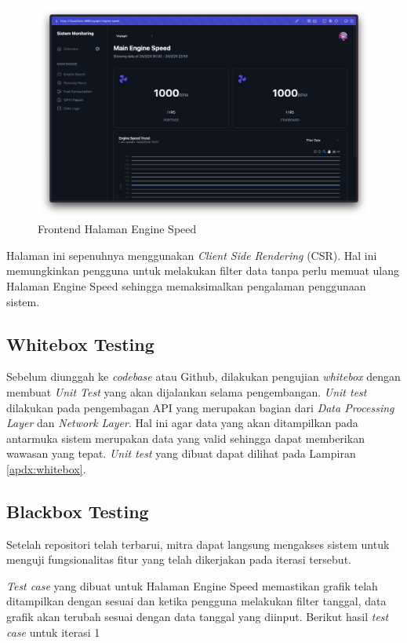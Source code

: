 \begin{figure}[!h]
    \includegraphics[width=1.05\linewidth, center]{images/hasil/iterations/1/fe-es.png}
    \caption{Frontend Halaman Engine Speed}
    \label{fig:fe-es}
\end{figure}

Halaman ini sepenuhnya menggunakan \textit{Client Side Rendering} (CSR). Hal ini memungkinkan pengguna untuk melakukan filter data tanpa perlu memuat ulang Halaman Engine Speed sehingga memaksimalkan pengalaman penggunaan sistem.

\subsection{Whitebox Testing}

Sebelum diunggah ke \textit{codebase} atau Github, dilakukan pengujian \textit{whitebox} dengan membuat \textit{Unit Test} yang akan dijalankan selama pengembangan. \textit{Unit test} dilakukan pada pengembagan API yang merupakan bagian dari \textit{Data Processing Layer} dan \textit{Network Layer}. Hal ini agar data yang akan ditampilkan pada antarmuka sistem merupakan data yang valid sehingga dapat memberikan wawasan yang tepat. \textit{Unit test} yang dibuat dapat dilihat pada Lampiran \ref{apdx:whitebox}.

\begin{landscape}

    \subsection{Blackbox Testing}

    Setelah repositori telah terbarui, mitra dapat langsung mengakses sistem untuk menguji fungsionalitas fitur yang telah dikerjakan pada iterasi tersebut.

    

    \textit{Test case} yang dibuat untuk Halaman Engine Speed memastikan grafik telah ditampilkan dengan sesuai dan ketika pengguna melakukan filter tanggal, data grafik akan terubah sesuai dengan data tanggal yang diinput. Berikut hasil \textit{test case} untuk iterasi 1

    
\end{landscape}

